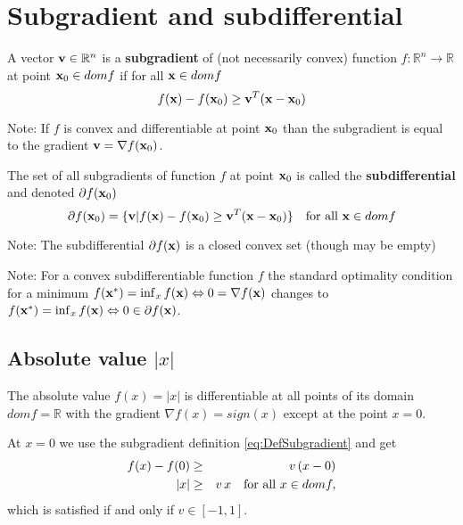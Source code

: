 
\clearpage

\section{Subgradient and subdifferential}

\begin{definition}
A vector $\mathbf{v} \in \mathbb{R}^n$ is a \textbf{subgradient} of (not necessarily convex) function $f:\mathbb{R}^n \to \mathbb{R}$ at point $\mathbf{x}_0 \in dom f$ if for all $\mathbf{x} \in dom f$
\begin{equation}\label{eq:DefSubgradient}
f(\mathbf{x}) - f(\mathbf{x}_0) \geq \mathbf{v}^T (\mathbf{x} - \mathbf{x}_0)
\end{equation}
\end{definition}
Note: If $f$ is convex and differentiable at point $\mathbf{x}_0$ than the subgradient is equal to the gradient $\mathbf{v} = \nabla f(\mathbf{x}_0)$.

\begin{definition}
The set of all subgradients of function $f$ at point $\mathbf{x}_0$ is called the \textbf{subdifferential} and denoted $\partial f(\mathbf{x}_0)$
\begin{equation}\label{eq:DefDifferential}
\partial f(\mathbf{x}_0) = \{\mathbf{v}| f(\mathbf{x}) - f(\mathbf{x}_0) \geq \mathbf{v}^T (\mathbf{x} - \mathbf{x}_0) \} \quad \text{for all } \mathbf{x} \in dom f
\end{equation}
\end{definition}
Note: The subdifferential $\partial f(\mathbf{x})$ is a closed convex set (though may be empty)

Note: For a convex subdifferentiable function $f$ the standard optimality condition for a minimum $f(\mathbf{x}^*) = \inf_x f(\mathbf{x}) \Leftrightarrow 0=\nabla f(\mathbf{x})$ changes to 
$f(\mathbf{x}^*) = \inf_x f(\mathbf{x}) \Leftrightarrow 0 \in \partial f(\mathbf{x})$.

\subsection{Absolute value $|x|$}
The absolute value $f(x) = |x|$ is differentiable at all points of its domain $dom f = \mathbb{R}$ with the gradient $\nabla f(x) = sign(x)$ except at the point $x=0$.

At $x=0$ we use the subgradient definition \eqref{eq:DefSubgradient} and get
\begin{eqnarray}
f(x) - f(0) & \geq & v \, (x - 0) \nonumber \\ 
|x| & \geq & v \, x  \quad \text{for all } x \in dom f , 
\end{eqnarray}
which is satisfied if and only if $v \in [-1,1]$.

